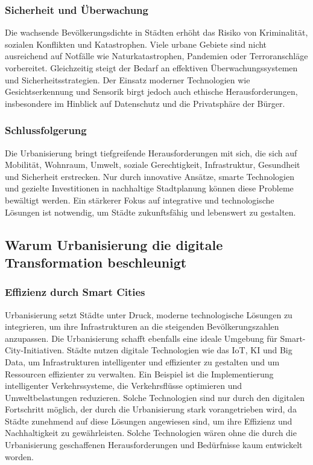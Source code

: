 \documentclass[conference,compsoc,final,a4paper, onecolumn, 11pt]{IEEEtran}
\begin{document}
\subsubsection{Sicherheit und Überwachung}
Die wachsende Bevölkerungsdichte in Städten erhöht das Risiko von Kriminalität, sozialen Konflikten und Katastrophen. 
Viele urbane Gebiete sind nicht ausreichend auf Notfälle wie Naturkatastrophen, Pandemien oder Terroranschläge vorbereitet. 
Gleichzeitig steigt der Bedarf an effektiven Überwachungssystemen und Sicherheitsstrategien. 
Der Einsatz moderner Technologien wie Gesichtserkennung und Sensorik birgt jedoch auch ethische Herausforderungen, insbesondere im Hinblick auf Datenschutz und die Privatsphäre der Bürger.\autocite{mckinsey_smart_cities}


\subsubsection{Schlussfolgerung}
Die Urbanisierung bringt tiefgreifende Herausforderungen mit sich, die sich auf Mobilität, Wohnraum, Umwelt, soziale Gerechtigkeit, Infrastruktur, Gesundheit und Sicherheit erstrecken. 
Nur durch innovative Ansätze, smarte Technologien und gezielte Investitionen in nachhaltige Stadtplanung können diese Probleme bewältigt werden. 
Ein stärkerer Fokus auf integrative und technologische Lösungen ist notwendig, um Städte zukunftsfähig und lebenswert zu gestalten.


\subsection{Warum Urbanisierung die digitale Transformation beschleunigt}

\subsubsection{Effizienz durch Smart Cities}
Urbanisierung setzt Städte unter Druck, moderne technologische Lösungen zu integrieren, um ihre Infrastrukturen an die steigenden Bevölkerungszahlen anzupassen.
Die Urbanisierung schafft ebenfalls eine ideale Umgebung für Smart-City-Initiativen. 
Städte nutzen digitale Technologien wie das \ac{IoT}, \ac{KI} und Big Data, um Infrastrukturen intelligenter und effizienter zu gestalten und um Ressourcen effizienter zu verwalten.
Ein Beispiel ist die Implementierung intelligenter Verkehrssysteme, die Verkehrsflüsse optimieren und Umweltbelastungen reduzieren. 
Solche Technologien sind nur durch den digitalen Fortschritt möglich, der durch die Urbanisierung stark vorangetrieben wird, da Städte zunehmend auf diese Lösungen angewiesen sind, um ihre Effizienz und Nachhaltigkeit zu gewährleisten.
Solche Technologien wären ohne die durch die Urbanisierung geschaffenen Herausforderungen und Bedürfnisse kaum entwickelt worden. \autocite{mckinsey_smart_cities}
\end{document}
